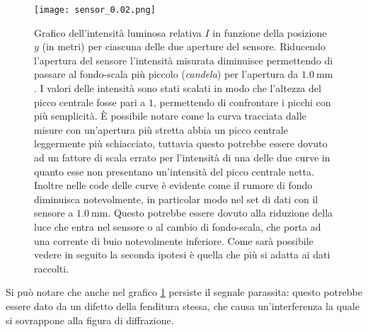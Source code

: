 \documentclass[../main.tex]{subfiles}
\begin{document}
\begin{figure}[ht!]
    \centering
    \texttt{[image: sensor\_0.02.png]}
    \caption{Grafico dell'intensità luminosa relativa $I$ in funzione della posizione $y$ (in metri) per ciascuna delle due aperture del sensore.
        Riducendo l'apertura del sensore l'intensità misurata diminuisce permettendo di passare al fondo-scala più piccolo (\textit{candela}) per l'apertura da $\qty{1.0}{\mm}$.
        I valori delle intensità sono stati scalati in modo che l'altezza del picco centrale fosse pari a $1$, permettendo di confrontare i picchi con più semplicità. È possibile notare come la curva tracciata dalle misure con un'apertura più stretta abbia un picco centrale leggermente più schiacciato, tuttavia questo potrebbe essere dovuto ad un fattore di scala errato per l'intensità di una delle due curve in quanto esse non presentano un'intensità del picco centrale netta.
        Inoltre nelle code delle curve è evidente come il rumore di fondo diminuisca notevolmente, in particolar modo nel set di dati con il sensore a $\qty{1.0}{\mm}$. Questo potrebbe essere dovuto alla riduzione della luce che entra nel sensore o al cambio di fondo-scala, che porta ad una corrente di buio notevolmente inferiore. %
        Come sarà possibile vedere in seguito la seconda ipotesi è quella che più si adatta ai dati raccolti.} %
    \label{fig:sensore 0.02}
\end{figure}

Si può notare che anche nel grafico \ref{fig:sensore 0.02} persiste il segnale parassita: questo potrebbe essere dato da un difetto della fenditura stessa, che causa un'interferenza la quale si sovrappone alla figura di diffrazione.
\end{document}

